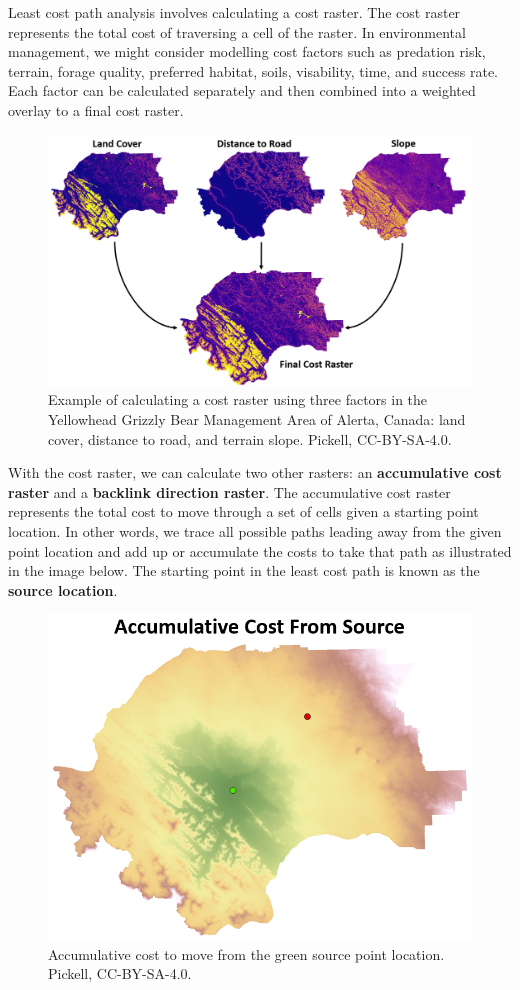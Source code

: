 \documentclass[
]{book}
\begin{document}
Least cost path analysis involves calculating a cost raster. The cost raster represents the total cost of traversing a cell of the raster. In environmental management, we might consider modelling cost factors such as predation risk, terrain, forage quality, preferred habitat, soils, visability, time, and success rate. Each factor can be calculated separately and then combined into a weighted overlay to a final cost raster.

\begin{figure}
\includegraphics[width=0.75\linewidth]{images/08-calculating-cost-raster} \caption{Example of calculating a cost raster using three factors in the Yellowhead Grizzly Bear Management Area of Alerta, Canada: land cover, distance to road, and terrain slope. Pickell, CC-BY-SA-4.0.}\label{fig:8-calculating-cost-raster}
\end{figure}

With the cost raster, we can calculate two other rasters: an \textbf{accumulative cost raster} and a \textbf{backlink direction raster}. The accumulative cost raster represents the total cost to move through a set of cells given a starting point location. In other words, we trace all possible paths leading away from the given point location and add up or accumulate the costs to take that path as illustrated in the image below. The starting point in the least cost path is known as the \textbf{source location}.

\begin{figure}
\includegraphics[width=0.75\linewidth]{images/08-accumulative-cost-from-source} \caption{Accumulative cost to move from the green source point location. Pickell, CC-BY-SA-4.0.}\label{fig:8-accumulative-cost-from-source}
\end{figure}
\end{document}
